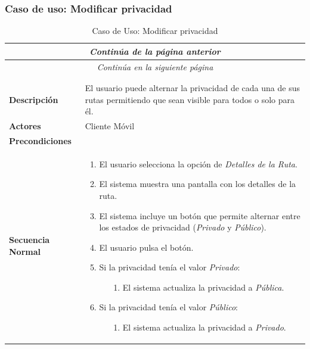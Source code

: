 \newpage
\subsubsection*{Caso de uso: Modificar privacidad}
\begin{longtable}{| p{4cm} | p{10cm} |}
\endfirsthead
\multicolumn{2}{c}{\textit{Continúa de la página anterior}}\\[12pt]
\hline
\endhead
\hline
\multicolumn{2}{c}{\textit{Continúa en la siguiente página}} \\
\endfoot
\hline
\caption{Caso de Uso: Modificar privacidad}\label{fig:1}\\
\endlastfoot


\hline
\multicolumn{2}{|c|}{\textbf{CU$<$08$>$ - Modificar Privacidad}} \\

\hline
\textbf{Descripción} &
El usuario puede alternar la privacidad de cada una de sus rutas permitiendo que sean visible para todos o solo para él.\\

\hline
\textbf{Actores} &
Cliente Móvil\\

\hline
\textbf{Precondiciones} &
\\

\hline
\textbf{Secuencia Normal} &\mbox{}\par\vspace{-\baselineskip}
\begin{enumerate}[leftmargin=0.7cm, topsep=0.1cm]
\item El usuario selecciona la opción de \textit{Detalles de la Ruta}.
\item El sistema muestra una pantalla con los detalles de la ruta.
\item El sistema incluye un botón que permite alternar entre los estados de privacidad (\textit{Privado} y \textit{Público}).
\item El usuario pulsa el botón.
\item Si la privacidad tenía el valor \textit{Privado}:
	\begin{itemize}
	\item[1.] El sistema actualiza la privacidad a \textit{Pública}.
	\end{itemize}
\item Si la privacidad tenía el valor \textit{Público}:
	\begin{itemize}
	\item[1.] El sistema actualiza la privacidad a \textit{Privado}.
	\end{itemize}
\end{enumerate}\\


\end{longtable}
